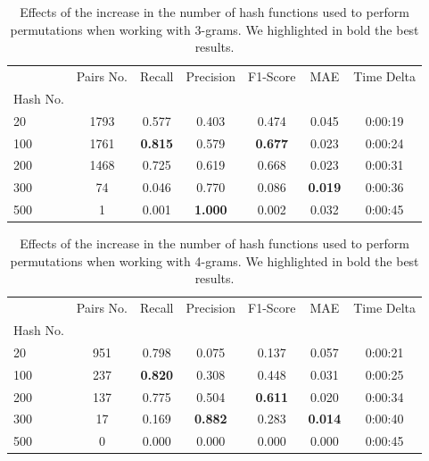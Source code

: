\documentclass[runningheads]{llncs}
\begin{document}
\begin{table}
  \caption{Effects of the increase in the number of hash functions used to perform permutations when working with 3-grams. We highlighted in bold the best results.}
  \label{tab:experiments:hashes_k3}
  \centering
  \begin{tabular}{lcccccc}
    \toprule
    {} &  Pairs No. &  Recall &  Precision &  F1-Score &    MAE & Time Delta \\
    Hash No. &            &         &            &           &        &            \\
    \midrule
    20       &       1793 &   0.577 &      0.403 &     0.474 &  0.045 &    0:00:19 \\
    100      &       1761 &   \textbf{0.815} &      0.579 &     \textbf{0.677} &  0.023 &    0:00:24 \\
    200      &       1468 &   0.725 &      0.619 &     0.668 &  0.023 &    0:00:31 \\
    300      &         74 &   0.046 &      0.770 &     0.086 &  \textbf{0.019} &    0:00:36 \\
    500      &          1 &   0.001 &      \textbf{1.000} &     0.002 &  0.032 &    0:00:45 \\
    \bottomrule
    \end{tabular}
\end{table}

\begin{table}
  \caption{Effects of the increase in the number of hash functions used to perform permutations when working with 4-grams. We highlighted in bold the best results.}
  \label{tab:experiments:hashes_k4}
  \centering
  \begin{tabular}{lcccccc}
    \toprule
    {} &  Pairs No. &  Recall &  Precision &  F1-Score &    MAE & Time Delta \\
    Hash No. &            &         &            &           &        &            \\
    \midrule
    20       &        951 &   0.798 &      0.075 &     0.137 &  0.057 &    0:00:21 \\
    100      &        237 &   \textbf{0.820} &      0.308 &     0.448 &  0.031 &    0:00:25 \\
    200      &        137 &   0.775 &      0.504 &     \textbf{0.611} &  0.020 &    0:00:34 \\
    300      &         17 &   0.169 &      \textbf{0.882} &     0.283 &  \textbf{0.014} &    0:00:40 \\
    500      &          0 &   0.000 &      0.000 &     0.000 &  0.000 &    0:00:45 \\
    \bottomrule
    \end{tabular}
\end{table}
\end{document}
